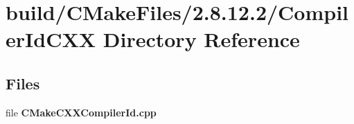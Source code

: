 \section{build/\-C\-Make\-Files/2.8.12.2/\-Compiler\-Id\-C\-X\-X Directory Reference}
\label{dir_3c20749e46078323b537ef82e32dbf1e}
\subsection*{Files}
\begin{DoxyCompactItemize}
\item 
file {\bf C\-Make\-C\-X\-X\-Compiler\-Id.\-cpp}
\end{DoxyCompactItemize}
